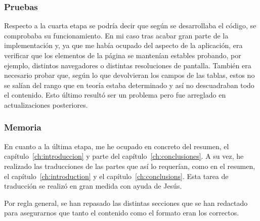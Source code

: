 \subsubsection{Pruebas}
Respecto a la cuarta etapa se podría decir que según se desarrollaba el código, se comprobaba su funcionamiento. En mi caso tras acabar gran parte de la implementación y, ya que me había ocupado del aspecto de la aplicación, era verificar que los elementos de la página se mantenían estables probando, por ejemplo, distintos navegadores o distintas resoluciones de pantalla. También era necesario probar que, según lo que devolvieran los campos de las tablas, estos no se salían del rango que en teoría estaba determinado y así no descuadraban todo el contenido. Esto último resultó ser un problema pero fue arreglado en actualizaciones posteriores.
\subsubsection{Memoria}
En cuanto a la última etapa, me he ocupado en concreto del resumen, el capítulo~\ref{ch:introduccion} y parte del capítulo~\ref{ch:conclusiones}. A su vez, he realizado las traducciones de las partes que así lo requerían, como en el resumen, el capítulo~\ref{ch:introduction} y el capítulo~\ref{ch:conclusions}. Esta tarea de traducción se realizó en gran medida con ayuda de Jesús.\par
Por regla general, se han repasado las distintas secciones que se han redactado para asegurarnos que tanto el contenido como el formato eran los correctos.

\noindent
